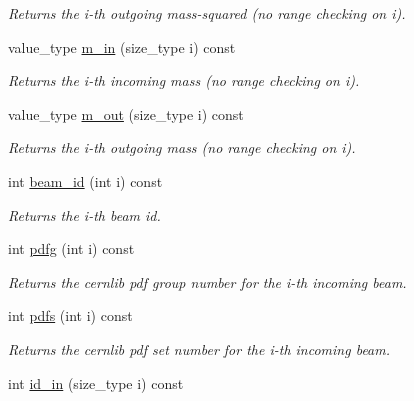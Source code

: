 \begin{DoxyCompactItemize}
\begin{DoxyCompactList}\small\item\em Returns the i-\/th outgoing mass-\/squared (no range checking on i). \end{DoxyCompactList}\item 
\hypertarget{a00436_a0d7e11bb6847f807fa13aa38d27baf34}{}value\+\_\+type \hyperlink{a00436_a0d7e11bb6847f807fa13aa38d27baf34}{m\+\_\+in} (size\+\_\+type i) const \label{a00436_a0d7e11bb6847f807fa13aa38d27baf34}

\begin{DoxyCompactList}\small\item\em Returns the i-\/th incoming mass (no range checking on i). \end{DoxyCompactList}\item 
\hypertarget{a00436_a0764bde067cdc21b0aa2ca0d8318c008}{}value\+\_\+type \hyperlink{a00436_a0764bde067cdc21b0aa2ca0d8318c008}{m\+\_\+out} (size\+\_\+type i) const \label{a00436_a0764bde067cdc21b0aa2ca0d8318c008}

\begin{DoxyCompactList}\small\item\em Returns the i-\/th outgoing mass (no range checking on i). \end{DoxyCompactList}\item 
\hypertarget{a00436_a6841f702b3f6461196ac7bf89c047ab8}{}int \hyperlink{a00436_a6841f702b3f6461196ac7bf89c047ab8}{beam\+\_\+id} (int i) const \label{a00436_a6841f702b3f6461196ac7bf89c047ab8}

\begin{DoxyCompactList}\small\item\em Returns the i-\/th beam id. \end{DoxyCompactList}\item 
\hypertarget{a00436_a23df6b1572d4be25d5ee1dc86d0700ac}{}int \hyperlink{a00436_a23df6b1572d4be25d5ee1dc86d0700ac}{pdfg} (int i) const \label{a00436_a23df6b1572d4be25d5ee1dc86d0700ac}

\begin{DoxyCompactList}\small\item\em Returns the cernlib pdf group number for the i-\/th incoming beam. \end{DoxyCompactList}\item 
\hypertarget{a00436_a62e1c791346f96085c141a54097cfbf5}{}int \hyperlink{a00436_a62e1c791346f96085c141a54097cfbf5}{pdfs} (int i) const \label{a00436_a62e1c791346f96085c141a54097cfbf5}

\begin{DoxyCompactList}\small\item\em Returns the cernlib pdf set number for the i-\/th incoming beam. \end{DoxyCompactList}\item 
\hypertarget{a00436_ac449cf781eb308c647407c1b5d02dbf4}{}int \hyperlink{a00436_ac449cf781eb308c647407c1b5d02dbf4}{id\+\_\+in} (size\+\_\+type i) const \label{a00436_ac449cf781eb308c647407c1b5d02dbf4}


\end{DoxyCompactItemize}
